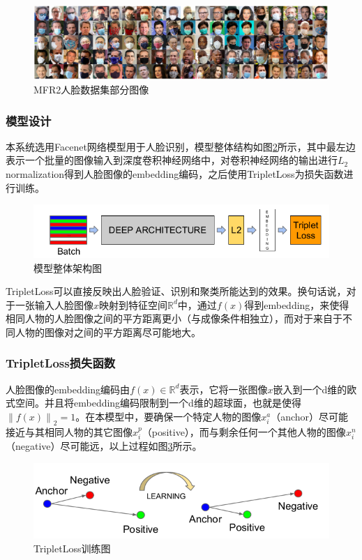 \begin{figure}[H]
    \centering
    \includegraphics[width=.75\textwidth]{figures/4mfr2.png}
    \caption{MFR2人脸数据集部分图像}
    \label{fig:mfr2}
\end{figure}

\subsubsection{模型设计}

本系统选用Facenet网络模型用于人脸识别，模型整体结构如图\ref{fig:modelarc}所示，其中最左边表示一个批量的图像输入到深度卷积神经网络中，对卷积神经网络的输出进行$L_{2}$ normalization得到人脸图像的embedding编码，之后使用TripletLoss为损失函数进行训练。

\begin{figure}[H]
    \centering
    \includegraphics[width=.75\textwidth]{figures/4modelarc.png}
    \caption{模型整体架构图}
    \label{fig:modelarc}
\end{figure}

TripletLoss可以直接反映出人脸验证、识别和聚类所能达到的效果。换句话说，对于一张输入人脸图像$x$映射到特征空间$\mathbb{R}^d$中，通过$f(x)$得到embedding，来使得相同人物的人脸图像之间的平方距离更小（与成像条件相独立），而对于来自于不同人物的图像对之间的平方距离尽可能地大。

\subsubsection{TripletLoss损失函数}

人脸图像的embedding编码由$f(x)\in\mathbb{R}^d$表示，它将一张图像$x$嵌入到一个d维的欧式空间。并且将embedding编码限制到一个d维的超球面，也就是使得$\left \| f(x) \right \| _2=1$。在本模型中，要确保一个特定人物的图像$x_i^a$（anchor）尽可能接近与其相同人物的其它图像$x_i^p$（positive），而与剩余任何一个其他人物的图像$x_i^n$（negative）尽可能远，以上过程如图\ref{fig:tpltll}所示。

\begin{figure}[H]
    \centering
    \includegraphics[width=.75\textwidth]{figures/4tpltll.png}
    \caption{TripletLoss训练图}
    \label{fig:tpltll}
\end{figure}

